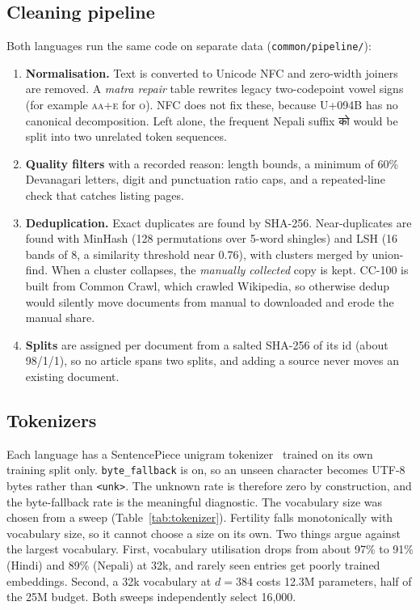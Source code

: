 \documentclass[10pt,a4paper]{article}
\newcommand{\code}[1]{\texttt{#1}}
\begin{document}
\subsection{Cleaning pipeline}
Both languages run the same code on separate data (\code{common/pipeline/}):
\begin{enumerate}
\item \textbf{Normalisation.} Text is converted to Unicode NFC and zero-width joiners are removed. A \emph{matra repair} table rewrites legacy two-codepoint vowel signs (for example \textsc{aa}+\textsc{e} for \textsc{o}). NFC does not fix these, because U+094B has no canonical decomposition. Left alone, the frequent Nepali suffix को would be split into two unrelated token sequences.
\item \textbf{Quality filters} with a recorded reason: length bounds, a minimum of 60\% Devanagari letters, digit and punctuation ratio caps, and a repeated-line check that catches listing pages.
\item \textbf{Deduplication.} Exact duplicates are found by SHA-256. Near-duplicates are found with MinHash (128 permutations over 5-word shingles) and LSH (16 bands of 8, a similarity threshold near 0.76), with clusters merged by union-find. When a cluster collapses, the \emph{manually collected} copy is kept. CC-100 is built from Common Crawl, which crawled Wikipedia, so otherwise dedup would silently move documents from manual to downloaded and erode the manual share.
\item \textbf{Splits} are assigned per document from a salted SHA-256 of its id (about 98/1/1), so no article spans two splits, and adding a source never moves an existing document.
\end{enumerate}

\subsection{Tokenizers}
Each language has a SentencePiece unigram tokenizer~\cite{sentencepiece,unigram} trained on its own training split only.
\code{byte\_fallback} is on, so an unseen character becomes UTF-8 bytes rather than \code{<unk>}. The unknown rate is therefore zero by construction, and the byte-fallback rate is the meaningful diagnostic.
The vocabulary size was chosen from a sweep (Table~\ref{tab:tokenizer}).
Fertility falls monotonically with vocabulary size, so it cannot choose a size on its own.
Two things argue against the largest vocabulary. First, vocabulary utilisation drops from about 97\% to 91\% (Hindi) and 89\% (Nepali) at 32k, and rarely seen entries get poorly trained embeddings. Second, a 32k vocabulary at $d=384$ costs 12.3M parameters, half of the 25M budget.
Both sweeps independently select 16{,}000.
\end{document}
